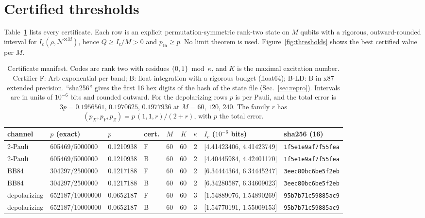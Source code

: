 \documentclass[aps,pra,reprint,superscriptaddress,nofootinbib,longbibliography,floatfix]{revtex4-2}
\theoremstyle{remark}
\newcommand{\Ic}{I_c}
\begin{document}
\section{Certified thresholds}
\label{sec:results}

Table~\ref{tab:certs} lists every certificate. Each row is an explicit permutation-symmetric rank-two
state on $M$ qubits with a rigorous, outward-rounded interval for $\Ic(\rho,\mathcal N^{\otimes M})$,
hence $Q\ge\Ic/M>0$ and $p_{\mathrm{th}}\ge p$. No limit theorem is used. Figure~\ref{fig:thresholds}
shows the best certified value per $M$.

\begin{table}[t]
\caption{Certificate manifest. Codes are rank two with residues $\{0,1\}\bmod\kappa$, and $K$ is the
maximal excitation number. Certifier F: Arb exponential per band; B: float integration with a rigorous
budget (float64); B-LD: B in x87 extended precision. ``sha256'' gives the first 16 hex digits of the
hash of the state file (Sec.~\ref{sec:repro}). Intervals are in units of $10^{-6}$ bits and rounded
outward. For the depolarizing rows $p$ is per Pauli, and the total error is $3p=0.1956561$,
$0.1970625$, $0.1977936$ at $M=60$, $120$, $240$. The family $r$ has $(p_X,p_Y,p_Z)=p\,(1,1,r)/(2+r)$,
with $p$ the total error.}
\label{tab:certs}
\footnotesize
\begin{ruledtabular}
\begin{tabular}{llllrrcll}
channel & $p$ (exact) & $p$ & cert. & $M$ & $K$ & $\kappa$ & $\Ic$ ($10^{-6}$ bits) & sha256 (16)\\
\hline
2-Pauli & 605469/5000000 & 0.1210938 & F & 60 & 60 & 2 & [4.41423406, 4.41423749] & \texttt{1f5e1e9af7f55fea}\\
2-Pauli & 605469/5000000 & 0.1210938 & B & 60 & 60 & 2 & [4.40445984, 4.42401170] & \texttt{1f5e1e9af7f55fea}\\
BB84 & 304297/2500000 & 0.1217188 & F & 60 & 60 & 2 & [6.34444364, 6.34445247] & \texttt{3eec80bc6be5f2eb}\\
BB84 & 304297/2500000 & 0.1217188 & B & 60 & 60 & 2 & [6.34280587, 6.34609023] & \texttt{3eec80bc6be5f2eb}\\
depolarizing & 652187/10000000 & 0.0652187 & F & 60 & 60 & 3 & [1.54889076, 1.54890269] & \texttt{95b7b71c59885ac9}\\
depolarizing & 652187/10000000 & 0.0652187 & B & 60 & 60 & 3 & [1.54770191, 1.55009153] & \texttt{95b7b71c59885ac9}\\

\end{tabular}
\end{ruledtabular}
\end{table}
\end{document}
